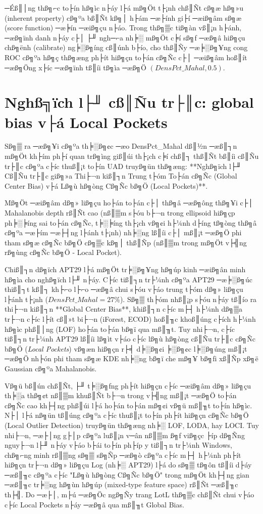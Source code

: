 ﻿\documentclass[../main.tex]{subfiles}
\begin{document}
─Éß║│ng thß╗⌐c to├ín hß╗ìc n├áy l├á mß╗Öt t├¡nh chß║Ñt cß╗æ hß╗»u (inherent property) cß╗ºa bß║Ñt kß╗│ h├ám ─æ├ính gi├í ─æiß╗âm sß╗æ (score function) ─æ╞ín ─æiß╗çu n├áo. Trong thß╗▒c tiß╗àn vß║¡n h├ánh, ─æß╗ïnh danh n├áy c├│ ├╜ ngh─⌐a nh╞░ mß╗Öt c╞í sß╗ƒ ─æß╗â hiß╗çu chß╗ënh (calibrate) ng╞░ß╗íng cß║únh b├ío, cho thß║Ñy ─æ╞░ß╗¥ng cong ROC cß╗ºa hß╗ç thß╗æng ph├ít hiß╗çn to├án cß╗Ñc c├│ ─æiß╗âm hoß║ít ─æß╗Öng x├íc ─æß╗ïnh tß║íi tß╗ìa ─æß╗Ö $(DensPct\_Mahal, 0.5)$.

\section{Nghß╗ïch l├╜ cß║Ñu tr├║c: global bias v├á Local Pockets}
\label{section:2.6}

Sß╗▒ ra ─æß╗¥i cß╗ºa th╞░ß╗¢c ─æo DensPct\_Mahal dß║½n ─æß║┐n mß╗Öt kh├ím ph├í quan trß╗ìng giß║úi th├¡ch c╞í chß║┐ thß║Ñt bß║íi cß║Ñu tr├║c cß╗ºa c├íc thuß║¡t to├ín UAD truyß╗ün thß╗æng: **Nghß╗ïch l├╜ Cß║Ñu tr├║c giß╗»a Thi├¬n kiß║┐n Trung t├óm To├án cß╗Ñc (Global Center Bias) v├á Lß╗ù hß╗òng Cß╗Ñc bß╗Ö (Local Pockets)**.

Mß╗Öt ─æiß╗âm dß╗» liß╗çu ho├án to├án c├│ thß╗â ─æß╗ông thß╗¥i c├│ Mahalanobis depth rß║Ñt cao (nß║▒m s├óu b├¬n trong ellipsoid hiß╗çp ph╞░╞íng sai to├án cß╗Ñc, t╞░╞íng th├¡ch vß╗¢i h├¼nh d├íng tß╗òng thß╗â cß╗ºa ─æ├ím ─æ├┤ng l├ánh t├¡nh) nh╞░ng lß║íi c├│ mß║¡t ─æß╗Ö phi tham sß╗æ cß╗Ñc bß╗Ö cß╗▒c kß╗│ thß║Ñp (nß║▒m trong mß╗Öt v├╣ng rß╗ùng cß╗Ñc bß╗Ö - Local Pocket). 

Chiß║┐n dß╗ïch APT29 l├á mß╗Öt tr╞░ß╗¥ng hß╗úp kinh ─æiß╗ân minh hß╗ìa cho nghß╗ïch l├╜ n├áy. C├íc tiß║┐n tr├¼nh cß╗ºa APT29 ─æ╞░ß╗úc thiß║┐t kß║┐ kh├⌐o l├⌐o ─æß╗â chui s├óu v├áo trung t├óm dß╗» liß╗çu l├ánh t├¡nh ($DensPct\_Mahal = 27\%$). Sß╗▒ th├óm nhß║¡p s├óu n├áy tß║ío ra thi├¬n kiß║┐n **Global Center Bias**, khiß║┐n c├íc m├┤ h├¼nh dß╗▒a tr├¬n c├íc l├ít cß║»t bi├¬n (iForest, ECOD) hoß║╖c khoß║úng c├ích h├¼nh hß╗ìc phß║│ng (LOF) ho├án to├án bß╗ï qua mß║╖t. Tuy nhi├¬n, c├íc tiß║┐n tr├¼nh APT29 lß║íi lß╗ìt v├áo c├íc lß╗ù hß╗òng cß║Ñu tr├║c cß╗Ñc bß╗Ö (\textit{Local Pockets}) vß╗æn hiß╗çn r├╡ d╞░ß╗¢i ╞░ß╗¢c l╞░ß╗úng mß║¡t ─æß╗Ö nh├ón phi tham sß╗æ KDE nh╞░ng bß╗ï che mß╗¥ bß╗ƒi xß║Ñp xß╗ë Gaussian cß╗ºa Mahalanobis.

Vß╗ü bß║ún chß║Ñt, ├╜ t╞░ß╗ƒng ph├ít hiß╗çn c├íc ─æiß╗âm dß╗» liß╗çu th╞░a thß╗¢t nß║▒m khuß║Ñt b├¬n trong v├╣ng mß║¡t ─æß╗Ö to├án cß╗Ñc cao kh├┤ng phß║úi l├á ho├án to├án mß╗¢i vß╗ü mß║╖t to├ín hß╗ìc. N├│ l├á nß╗ün tß║úng cß╗ºa c├íc thuß║¡t to├ín ph├ít hiß╗çn cß╗Ñc bß╗Ö (Local Outlier Detection) truyß╗ün thß╗æng nh╞░ LOF, LODA, hay LOCI. Tuy nhi├¬n, ─æ├│ng g├│p cß╗ºa luß║¡n v─ân nß║▒m ß╗ƒ viß╗çc ├íp dß╗Ñng nguy├¬n l├╜ n├áy v├áo b├ái to├ín ph├íp y tiß║┐n tr├¼nh Windows, chß╗⌐ng minh rß║▒ng sß╗▒ sß╗Ñp ─æß╗ò cß╗ºa c├íc m├┤ h├¼nh ph├ít hiß╗çn tr├¬n dß╗» liß╗çu Log (nh╞░ APT29) l├á do sß╗▒ tß╗ôn tß║íi d├áy ─æß║╖c cß╗ºa c├íc "Lß╗ù hß╗òng Cß╗Ñc bß╗Ö" trong mß╗Öt kh├┤ng gian ─æß║╖c tr╞░ng hß╗ùn hß╗úp (mixed-type feature space) rß║Ñt ─æß║╖c th├╣. Do ─æ├│, m├ú ─æß╗Öc ngß╗Ñy trang LotL thß╗▒c chß║Ñt chui v├áo c├íc Local Pockets n├áy ─æß╗â qua mß║╖t Global Bias.
\end{document}
